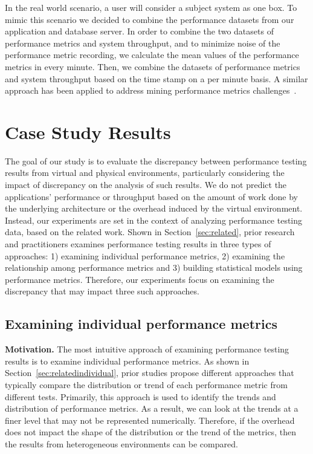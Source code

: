 \documentclass[smallextended]{svjour3}       %
\begin{document}
In the real world scenario, a user will consider a subject system as one box. To mimic this scenario we decided to combine the performance datasets from our application and database server. In order to combine the two datasets of performance metrics and system throughput, and to minimize noise of the performance metric recording, we calculate the mean values of the performance metrics in every minute. Then, we combine the datasets of performance metrics and system throughput based on the time stamp on a per minute basis. A similar approach has been applied to address mining performance metrics challenges~\cite{foo2010mining}.



\section{Case Study Results}
\label{sec:results}

The goal of our study is to evaluate the discrepancy between performance testing results from virtual and physical environments, particularly considering the impact of discrepancy on the analysis of such results. We do not predict the applications' performance or throughput based on the amount of work done by the underlying architecture or the overhead induced by the virtual environment. Instead, our experiments are set in the context of analyzing performance testing data, based on the related work. Shown in Section~\ref{sec:related}, prior research and practitioners examines performance testing results in three types of approaches: 1) examining individual performance metrics, 2) examining the relationship among performance metrics and 3) building statistical models using performance metrics. Therefore, our experiments focus on examining the discrepancy that may impact three such approaches.



\subsection{Examining individual performance metrics}
\label{sec:individual}


\noindent \textbf{Motivation.}
The most intuitive approach of examining performance testing results is to examine individual performance metrics. As shown in Section~\ref{sec:relatedindividual}, prior studies propose different approaches that typically compare the distribution or trend of each performance metric from different tests. Primarily, this approach is used to identify the trends and distribution of performance metrics. As a result, we can look at the trends at a finer level that may not be represented numerically. Therefore, if the overhead does not impact the shape of the distribution or the trend of the metrics, then the results from heterogeneous environments can be compared. 
\end{document}
